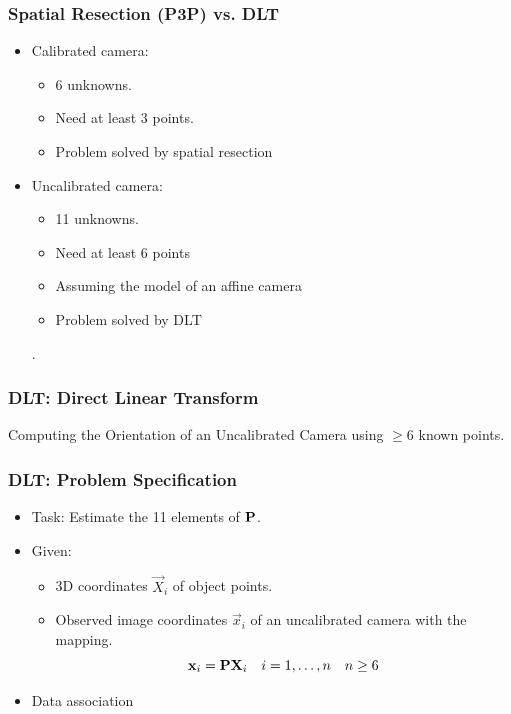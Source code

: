 \begin{frame}
  \frametitle{Spatial Resection (P3P) vs. DLT}
  \begin{itemize}
    \item Calibrated camera: 
    \begin{itemize}
      \item 6 unknowns.
      \item Need at least 3 points.
      \item Problem solved by spatial resection
    \end{itemize}
    \item Uncalibrated camera: 
    \begin{itemize}
      \item 11 unknowns.
      \item Need at least 6 points 
      \item Assuming the model of an affine camera
      \item Problem solved by DLT
    \end{itemize}.
  \end{itemize}
\end{frame}

\begin{frame}
  \frametitle{DLT: Direct Linear Transform}
  Computing the Orientation of an Uncalibrated Camera using $\ge 6$ known points.
\end{frame}

\begin{frame}
  \frametitle{DLT: Problem Specification}
  \begin{itemize}
    \item Task: Estimate the 11 elements of $\boldsymbol{\mathbf{P}}$.
    \item Given: 
    \begin{itemize}
      \item 3D coordinates $\vec{X}_{i}$ of object points.
      \item Observed image coordinates $\vec{x}_{i}$ of an uncalibrated camera with the mapping.
      \begin{equation*}
        \boldsymbol{\mathbf{x}}_{i} = \boldsymbol{\mathbf{P}} \boldsymbol{\mathbf{X}}_{i} \quad i=1,\ldots,n \quad n \ge 6
      \end{equation*}
    \end{itemize}
    \item Data association
  \end{itemize}

\end{frame}

